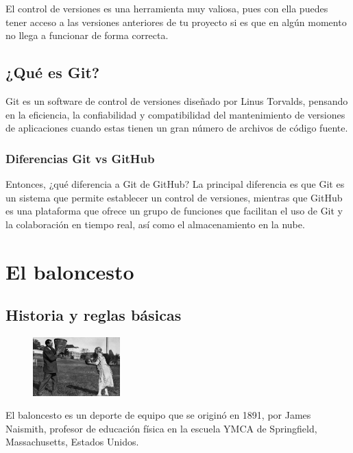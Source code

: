 \documentclass[paper=a4, fontsize=9pt]{article}
\begin{document}
El control de versiones es una herramienta muy valiosa, pues con ella puedes tener acceso a las versiones anteriores de tu proyecto si es que en algún momento no llega a funcionar de forma correcta.

\subsection{¿Qué es Git?}

Git es un software de control de versiones diseñado por Linus Torvalds, pensando en la eficiencia, la confiabilidad y compatibilidad del mantenimiento de versiones de aplicaciones cuando estas tienen un gran número de archivos de código fuente.

\subsubsection{Diferencias Git vs GitHub}

Entonces, ¿qué diferencia a Git de GitHub? La principal diferencia es que Git es un sistema que permite establecer un control de versiones, mientras que GitHub es una plataforma que ofrece un grupo de funciones que facilitan el uso de Git y la colaboración en tiempo real, así como el almacenamiento en la nube.

\section{El baloncesto}

\subsection{Historia y reglas básicas}

\begin{figure}
    \centering
    \includegraphics[width=0.3\textwidth]{imagenes/historia_baloncesto.jpg}
    \label{fig:hist_bskb}
\end{figure}

El baloncesto es un deporte de equipo que se originó en 1891, por James Naismith, profesor de educación física en la escuela YMCA de Springfield, Massachusetts, Estados Unidos.
\end{document}

